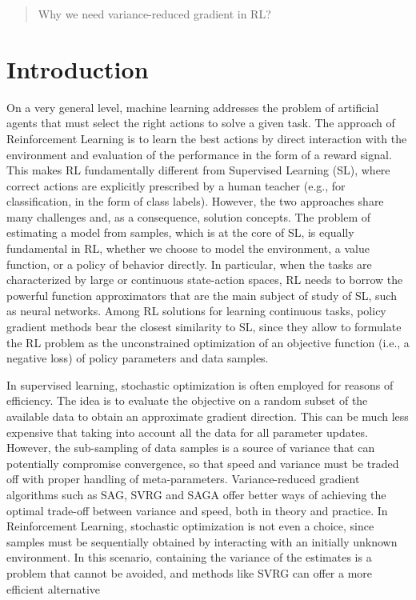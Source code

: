 \documentclass{article}
\makeatletter
\theoremstyle{remark}
\theoremstyle{definition}
\DeclareRobustCommand{\eg}{e.g.,\@\xspace}
\DeclareRobustCommand{\ie}{i.e.,\@\xspace}
\makeatother
\begin{document}
\begin{abstract}
Why we need variance-reduced gradient in RL?
\end{abstract}

\section{Introduction}
On a very general level, machine learning addresses the problem of artificial agents that must select the right actions to solve a given task. The approach of Reinforcement Learning \cite{sutton2011reinforcement} is to learn the best actions by direct interaction with the environment and evaluation of the performance in the form of a reward signal. This makes RL fundamentally different from Supervised Learning (SL), where correct actions are explicitly prescribed by a human teacher (\eg for classification, in the form of class labels). However, the two approaches share many challenges and, as a consequence, solution concepts. The problem of estimating a model from samples, which is at the core of SL, is equally fundamental in RL, whether we choose to model the environment, a value function, or a policy of behavior directly. In particular, when the tasks are characterized by large or continuous state-action spaces, RL needs to borrow the powerful function approximators that are the main subject of study of SL, such as neural networks. Among RL solutions for learning continuous tasks, policy gradient methods bear the closest similarity to SL, since they allow to formulate the RL problem as the unconstrained optimization of an objective function (\ie a negative loss) of policy parameters and data samples.

In supervised learning, stochastic optimization is often employed for reasons of efficiency. The idea is to evaluate the objective on a random subset of the available data to obtain an approximate gradient direction. This can be much less expensive that taking into account all the data for all parameter updates. However, the sub-sampling of data samples is a source of variance that can potentially compromise convergence, so that speed and variance must be traded off with proper handling of meta-parameters.
Variance-reduced gradient algorithms such as SAG, SVRG and SAGA offer better ways of achieving the optimal trade-off between variance and speed, both in theory and practice. 
In Reinforcement Learning, stochastic optimization is not even a choice, since samples must be sequentially obtained by interacting with an initially unknown environment. In this scenario, containing the variance of the estimates is a problem that cannot be avoided, and methods like SVRG can offer a more efficient alternative 
\end{document}
